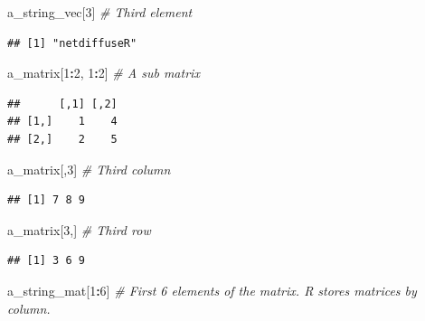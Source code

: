 \documentclass[]{book}
\newenvironment{Shaded}{\begin{snugshade}}{\end{snugshade}}
\newcommand{\CommentTok}[1]{\textcolor[rgb]{0.56,0.35,0.01}{\textit{#1}}}
\newcommand{\DecValTok}[1]{\textcolor[rgb]{0.00,0.00,0.81}{#1}}
\newcommand{\NormalTok}[1]{#1}
\newcommand{\OperatorTok}[1]{\textcolor[rgb]{0.81,0.36,0.00}{\textbf{#1}}}
\begin{document}
\begin{enumerate}
\begin{Shaded}
\begin{Highlighting}[]
\NormalTok{a_string_vec[}\DecValTok{3}\NormalTok{] }\CommentTok{# Third element}
\end{Highlighting}
\end{Shaded}

\begin{verbatim}
## [1] "netdiffuseR"
\end{verbatim}

\begin{Shaded}
\begin{Highlighting}[]
\NormalTok{a_matrix[}\DecValTok{1}\OperatorTok{:}\DecValTok{2}\NormalTok{, }\DecValTok{1}\OperatorTok{:}\DecValTok{2}\NormalTok{] }\CommentTok{# A sub matrix}
\end{Highlighting}
\end{Shaded}

\begin{verbatim}
##      [,1] [,2]
## [1,]    1    4
## [2,]    2    5
\end{verbatim}

\begin{Shaded}
\begin{Highlighting}[]
\NormalTok{a_matrix[,}\DecValTok{3}\NormalTok{] }\CommentTok{# Third column}
\end{Highlighting}
\end{Shaded}

\begin{verbatim}
## [1] 7 8 9
\end{verbatim}

\begin{Shaded}
\begin{Highlighting}[]
\NormalTok{a_matrix[}\DecValTok{3}\NormalTok{,] }\CommentTok{# Third row}
\end{Highlighting}
\end{Shaded}

\begin{verbatim}
## [1] 3 6 9
\end{verbatim}

\begin{Shaded}
\begin{Highlighting}[]
\NormalTok{a_string_mat[}\DecValTok{1}\OperatorTok{:}\DecValTok{6}\NormalTok{] }\CommentTok{# First 6 elements of the matrix. R stores matrices by column.}
\end{Highlighting}
\end{Shaded}


\end{enumerate}
\end{document}
